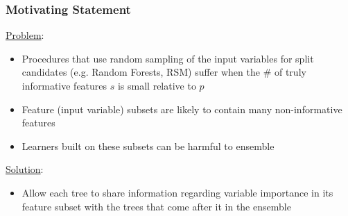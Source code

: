 \documentclass{beamer}
\begin{document}
\begin{frame}

    \frametitle{Motivating Statement}
    
    \underline{Problem}:
    \begin{itemize}
        \item Procedures that use random sampling of the input variables for
              split candidates (e.g. Random Forests, RSM) suffer when the \# 
              of truly informative features $s$ is small relative to $p$
        \item Feature (input variable) subsets are likely to contain many 
              non-informative features
        \item Learners built on these subsets can be harmful to ensemble
    \end{itemize}
    
    \medskip
    
    \underline{Solution}:
    \begin{itemize}
        \item Allow each tree to share information regarding variable importance
              in its feature subset with the trees that come after it in the 
              ensemble
    \end{itemize}
    
%    
    

\end{frame}


\end{document}
